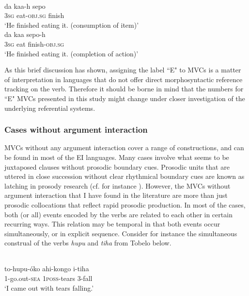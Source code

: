\ea 
{}\\
\ea \label{Buru4}
\gll da kaa-h sepo \\
3\textsc{sg} eat-\textsc{obj}.\textsc{sg} finish \\
\glft `He finished eating it. (consumption of item)' \\ 
\ex \label{Buru5}
\gll da kaa sepo-h \\ 
3\textsc{sg} eat finish-\textsc{obj}.\textsc{sg} \\
\glft `He finished eating it. (completion of action)'\\ 
\z
\z

As this brief discussion has shown, assigning the label ``E" to MVCs is a matter of interpretation in languages that do not offer direct morphosyntactic reference tracking on the verb. Therefore it should be borne in mind that the numbers for ``E" MVCs presented in this study might change under closer investigation of the underlying referential systems.

\subsubsection{Cases without argument interaction}

MVCs without any argument interaction cover a range of constructions, and can be found in most of the EI languages. Many cases involve what seems to be juxtaposed clauses without prosodic boundary cues. Prosodic units that are uttered in close succession without clear rhythmical boundary cues are known as latching in prosody research (cf. for instance \citealt{himmelmann2018}). However, the MVCs without argument interaction that I have found in the literature are more than just prosodic collocations that reflect rapid prosodic production. In most of the cases, both (or all) events encoded by the verbs are related to each other in certain recurring ways. This relation may be temporal in that both events occur simultaneously, or in explicit sequence.  Consider for instance the simultaneous construal of the verbs \textit{hupu} and \textit{tiha} from Tobelo below.

\ea 
{}\\
\gll to-hupu-óko ahi-kongo i-tiha \\
1-go.out-\textsc{sea} 1\textsc{poss}-tears 3-fall \\
\glft `I came out with tears falling.'\\ 
\z

